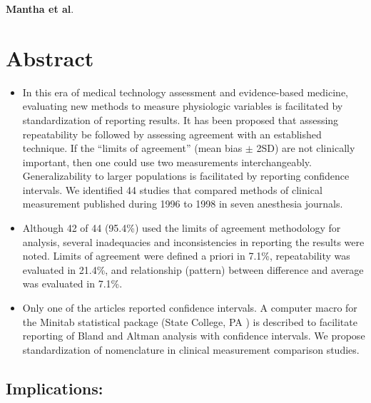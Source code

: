 \documentclass[MAIN.tex]{subfiles}
\begin{document}
{
	
\Large \textbf{Mantha et al}.

}	
	\section{Abstract}
	\begin{itemize}
		\item In this era of medical technology assessment and evidence-based medicine, evaluating new methods to measure physiologic variables is facilitated by standardization of reporting results. It has been proposed that assessing repeatability be followed by assessing agreement with an established technique. If the “limits of agreement” (mean bias $\pm$ 2SD) are not clinically important, then one could use two measurements interchangeably. Generalizability to larger populations is facilitated by reporting confidence intervals. We identified 44 studies that compared methods of clinical measurement published during 1996 to 1998 in seven anesthesia journals. 
		
		\item Although 42 of 44 (95.4\%) used the limits of agreement methodology for analysis, several inadequacies and inconsistencies in reporting the results were noted. Limits of agreement were defined a priori in 7.1\%, repeatability was evaluated in 21.4\%, and relationship (pattern) between difference and average was evaluated in 7.1\%. 
		\item Only one of the articles reported confidence intervals. A computer macro for the Minitab statistical package (State College, PA ) is described to facilitate reporting of Bland and Altman analysis with confidence intervals. We propose standardization of nomenclature in clinical measurement comparison studies.
		
	\end{itemize}
	\subsection*{Implications: }
	
\end{document}
